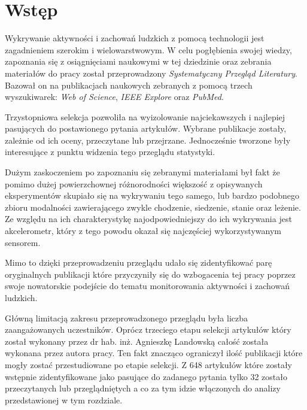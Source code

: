 \section{Wstęp}
Wykrywanie aktywności i zachowań ludzkich z pomocą technologii jest zagadnieniem szerokim i wielowarstwowym. W celu pogłębienia swojej wiedzy, zapoznania się z osiągnięciami naukowymi w tej dziedzinie oraz zebrania materiałów do pracy został przeprowadzony \textit{Systematyczny Przegląd Literatury}. Bazował on na publikacjach naukowych zebranych z pomocą trzech wyszukiwarek: \textit{Web of Science}, \textit{IEEE Explore} oraz \textit{PubMed}. 

Trzystopniowa selekcja pozwoliła na wyizolowanie najciekawszych i najlepiej pasujących do postawionego pytania artykułów. Wybrane publikacje zostały, zależnie od ich oceny, przeczytane lub przejrzane. Jednocześnie tworzone były interesujące z punktu widzenia tego przeglądu statystyki. 

Dużym zaskoczeniem po zapoznaniu się zebranymi materiałami był fakt że pomimo dużej powierzchownej  różnorodności większość z opisywanych eksperymentów skupiało się na wykrywaniu tego samego, lub bardzo podobnego zbioru modalności zawierającego zwykle chodzenie, siedzenie, stanie oraz leżenie. Ze względu na ich charakterystykę najodpowiedniejszy do ich wykrywania jest akcelerometr, który z tego powodu okazał się najczęściej wykorzystywanym sensorem.

Mimo to dzięki przeprowadzeniu przeglądu udało się zidentyfikować parę oryginalnych publikacji które przyczyniły się do wzbogacenia tej pracy poprzez swoje nowatorskie podejście do tematu monitorowania aktywności i zachowań ludzkich.

Główną limitacją zakresu przeprowadzonego przeglądu była liczba zaangażowanych uczestników. Oprócz trzeciego etapu selekcji artykułów który został wykonany przez dr hab. inż. Agnieszkę Landowską całość została wykonana przez autora pracy. Ten fakt znacząco ograniczył ilość publikacji które mogły zostać przestudiowane po etapie selekcji. Z 648 artykułów które zostały wstępnie zidentyfikowane jako pasujące do zadanego pytania tylko 32 zostało przeczytanych lub przeglądniętych a co za tym idzie włączonych do analizy przedstawionej w tym rozdziale.
